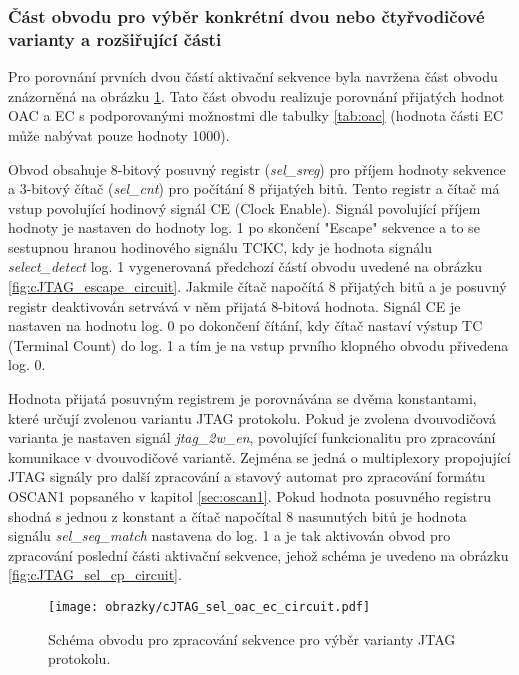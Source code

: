 \subsubsection{Část obvodu pro výběr konkrétní dvou nebo čtyřvodičové varianty a rozšiřující části}
Pro porovnání prvních dvou částí aktivační sekvence byla navržena část obvodu znázorněná na obrázku \ref{fig:cJTAG_sel_oac_ec_circuit}. Tato část obvodu realizuje porovnání přijatých hodnot \acs{OAC} a \acs{EC} s podporovanými možnostmi dle tabulky \ref{tab:oac} (hodnota části \acs{EC} může nabývat pouze hodnoty 1000).

Obvod obsahuje 8-bitový posuvný registr (\textit{sel\_sreg}) pro příjem hodnoty sekvence a 3-bitový čítač (\textit{sel\_cnt}) pro počítání 8 přijatých bitů. Tento registr a čítač má vstup povolující hodinový signál CE (Clock Enable). Signál povolující příjem hodnoty je nastaven do hodnoty log. 1 po skončení "Escape" sekvence a to se sestupnou hranou hodinového signálu \acs{TCKC}, kdy je hodnota signálu \textit{select\_detect} log. 1 vygenerovaná předchozí částí obvodu uvedené na obrázku \ref{fig:cJTAG_escape_circuit}. Jakmile čítač napočítá 8 přijatých bitů a je posuvný registr deaktivován setrvává v něm přijatá 8-bitová hodnota. Signál CE je nastaven na hodnotu log. 0 po dokončení čítání, kdy čítač nastaví výstup TC (Terminal Count) do log. 1 a tím je na vstup prvního klopného obvodu přivedena log. 0.

Hodnota přijatá posuvným registrem je porovnávána se dvěma konstantami, které určují zvolenou variantu \acs{JTAG} protokolu. Pokud je zvolena dvouvodičová varianta je nastaven signál \textit{jtag\_2w\_en}, povolující funkcionalitu pro zpracování komunikace v dvouvodičové variantě. Zejména se jedná o multiplexory propojující \acs{JTAG} signály pro další zpracování a stavový automat pro  zpracování formátu OSCAN1 popsaného v kapitol \ref{sec:oscan1}. Pokud hodnota posuvného registru shodná s jednou z konstant a čítač napočítal 8 nasunutých bitů je hodnota signálu \textit{sel\_seq\_match} nastavena do log. 1 a je tak aktivován obvod pro zpracování poslední části aktivační sekvence, jehož schéma je uvedeno na obrázku \ref{fig:cJTAG_sel_cp_circuit}. 

\begin{figure}[H]
  \begin{center}
    \texttt{[image: obrazky/cJTAG\_sel\_oac\_ec\_circuit.pdf]}
  \end{center}
  \caption{Schéma obvodu pro zpracování sekvence pro výběr varianty \acs{JTAG} protokolu.}
	\label{fig:cJTAG_sel_oac_ec_circuit}
\end{figure}

